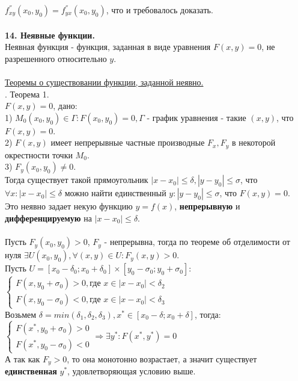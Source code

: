 \documentclass[12pt]{article}
\begin{document}
$f_{xy}^{''}(x_0,y_0) = f_{yx}^{''}(x_0,y_0)$, что и требовалось доказать.\\
\\
\label{question14_1}\textbf{14. Неявные функции.}\\
Неявная функция - функция, заданная в виде уравнения $F(x,y) = 0$, не разрешенного относительно $y$.\\
\\
\label{question14_2}\uline{Теоремы о существовании функции, заданной неявно.}\\
. Теорема 1.\\
$F(x,y)=0$, дано:\\
1) $M_0(x_0,y_0) \in \Gamma : F(x_0,y_0) = 0, \Gamma$ - график уравнения - такие $(x,y)$, что $F(x,y)=0$.\\
2) $F(x,y)$ имеет непрерывные частные производные $F_x, F_y$ в некоторой окрестности точки $M_0$.\\
3) $F_y(x_0,y_0) \neq 0$.\\
Тогда существует такой прямоугольник $|x-x_0|\leq\delta, |y-y_0|\leq\sigma$, что $\forall x : |x-x_0|\leq\delta$ можно найти единственный $y : |y-y_0|\leq\sigma$, что $F(x,y)=0$.\\
Это неявно задает некую функцию $y=f(x)$, \textbf{непрерывную} и \textbf{дифференцируемую} на $|x-x_0|\leq\delta$.\\
\\
Пусть $F_y(x_0,y_0) > 0$, $F_y$ - непрерывна, тогда по теореме об отделимости от нуля $\exists U(x_0,y_0), \forall (x,y) \in U : F_y(x,y) > 0$.\\
Пусть $U = [x_0-\delta_0;x_0+\delta_0] \times [y_0-\sigma_0;y_0+\sigma_0]$:\\
$\begin{cases}F(x,y_0 + \sigma_0)>0, \text{где } x \in |x-x_0|<\delta_2 \\ F(x,y_0 - \sigma_0)<0, \text{где } x \in |x-x_0|<\delta_3\end{cases}$\\
Возьмем $\delta = min(\delta_1,\delta_2,\delta_3), x^{*} \in [x_0-\delta;x_0+\delta]$, тогда:\\
$\begin{cases} F(x^{*}, y_0+\sigma_0) > 0 \\ F(x^{*},y_0-\sigma_0)<0 \end{cases} \Rightarrow \exists y^{*} : F(x^{*}, y^{*}) = 0$\\
А так как $F_y > 0$, то она монотонно возрастает, а значит существует \textbf{единственная} $y^{*}$, удовлетворяющая условию выше.\\
\end{document}
